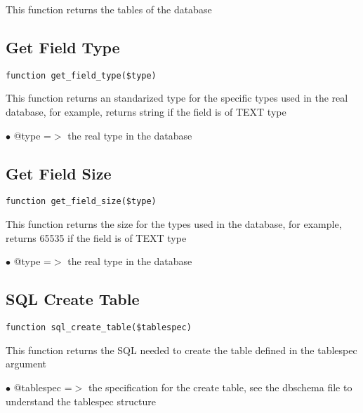 \documentclass[a4paper]{book}
\begin{document}
This function returns the tables of the database

\hypertarget{toc253}{}
\subsection{Get Field Type}

\begin{lstlisting}
function get_field_type($type)
\end{lstlisting}

This function returns an standarized type for the specific types used in
the real database, for example, returns string if the field is of TEXT type

\begin{compactitem}
\item[\color{myblue}$\bullet$] @type =$>$ the real type in the database
\end{compactitem}

\hypertarget{toc254}{}
\subsection{Get Field Size}

\begin{lstlisting}
function get_field_size($type)
\end{lstlisting}

This function returns the size for the types used in the database, for
example, returns 65535 if the field is of TEXT type

\begin{compactitem}
\item[\color{myblue}$\bullet$] @type =$>$ the real type in the database
\end{compactitem}

\hypertarget{toc255}{}
\subsection{SQL Create Table}

\begin{lstlisting}
function sql_create_table($tablespec)
\end{lstlisting}

This function returns the SQL needed to create the table defined in the
tablespec argument

\begin{compactitem}
\item[\color{myblue}$\bullet$] @tablespec =$>$ the specification for the create table, see the dbschema
              file to understand the tablespec structure
\end{compactitem}
\end{document}
